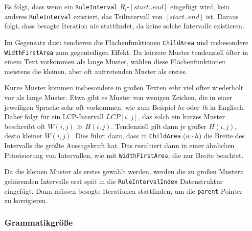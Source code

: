 Es folgt, dass wenn ein \texttt{RuleInterval} $R_i$-$[start..end]$ eingefügt wird, kein anderes \texttt{RuleInterval} existiert, das Teilintervall von $[start..end]$ ist. Daraus folgt, dass besagte Iteration nie stattfindet, da keine solche Intervalle existieren.

Im Gegensatz dazu tendieren die Flächenfunktionen \texttt{ChildArea} und insbesondere \texttt{WidthFirstArea} zum gegenteiligen Effekt. Da kürzere Muster tendenziell öfter in einem Text vorkommen als lange Muster, wählen diese Flächenfunktionen meistens die kleinen, aber oft auftretenden Muster als erstes.

Kurze Muster kommen insbesondere in großen Texten sehr viel öfter wiederholt vor als lange Muster. Etwa gibt es Muster von wenigen Zeichen, die in einer jeweiligen Sprache sehr oft vorkommen, wie zum Beispiel \emph{he} oder \emph{th} in Englisch. Daher folgt für ein LCP-Intervall $LCP[i..j]$, das solch ein kurzes Muster beschreibt oft $W(i,j) \gg H(i,j)$. Tendenziell gilt dann je größer $H(i,j)$, desto kleiner $W(i,j)$.
Dies führt dazu, dass in \texttt{ChildArea} ($w \cdot h$) die Breite des Intervalls die größte Aussagekraft hat. Das resultiert dann in einer ähnlichen Priorisierung von Intervallen, wie mit \texttt{WidthFirstArea}, die nur Breite beachtet.

Da die kleinen Muster als erstes gewählt werden, werden die zu großen Mustern gehörenden Intervalle erst spät in die \texttt{RuleIntervalIndex} Datenstruktur eingefügt. Dann müssen besagte Iterationen stattfinden, um die \texttt{parent} Pointer zu korrigieren. 

\subsubsection{Grammatikgröße}

